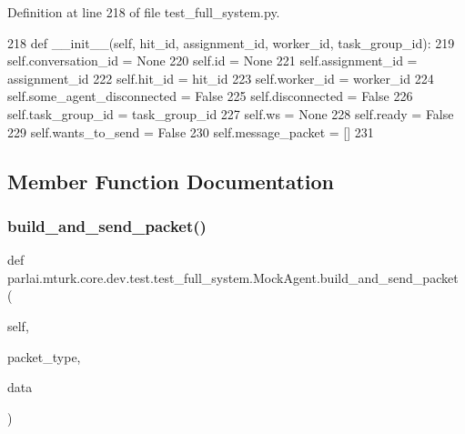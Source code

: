 Definition at line 218 of file test\+\_\+full\+\_\+system.\+py.


\begin{DoxyCode}
218     \textcolor{keyword}{def }\_\_init\_\_(self, hit\_id, assignment\_id, worker\_id, task\_group\_id):
219         self.conversation\_id = \textcolor{keywordtype}{None}
220         self.id = \textcolor{keywordtype}{None}
221         self.assignment\_id = assignment\_id
222         self.hit\_id = hit\_id
223         self.worker\_id = worker\_id
224         self.some\_agent\_disconnected = \textcolor{keyword}{False}
225         self.disconnected = \textcolor{keyword}{False}
226         self.task\_group\_id = task\_group\_id
227         self.ws = \textcolor{keywordtype}{None}
228         self.ready = \textcolor{keyword}{False}
229         self.wants\_to\_send = \textcolor{keyword}{False}
230         self.message\_packet = []
231 
\end{DoxyCode}


\subsection{Member Function Documentation}
\mbox{\label{classparlai_1_1mturk_1_1core_1_1dev_1_1test_1_1test__full__system_1_1MockAgent_a62cda90db92b3c458a48661f3a37be28}} 
\subsubsection{\texorpdfstring{build\+\_\+and\+\_\+send\+\_\+packet()}{build\_and\_send\_packet()}}
{\footnotesize\ttfamily def parlai.\+mturk.\+core.\+dev.\+test.\+test\+\_\+full\+\_\+system.\+Mock\+Agent.\+build\+\_\+and\+\_\+send\+\_\+packet (\begin{DoxyParamCaption}\item[{}]{self,  }\item[{}]{packet\+\_\+type,  }\item[{}]{data }\end{DoxyParamCaption})}



